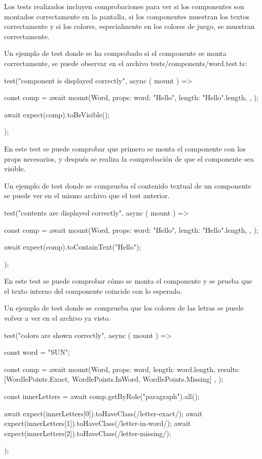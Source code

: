 Los tests realizados incluyen comprobaciones para ver si los componentes son montados correctamente en la pantalla, si los componentes muestran los textos correctamente y si los colores, especialmente en los colores de juego, se muestran correctamente.

Un ejemplo de test donde se ha comprobado si el componente se monta correctamente, se puede observar en el archivo tests/components/word.test.ts:

\begin{mytypescript}[float={!h},caption={Ejemplo test visibilidad componente.},label={alg:test_visibility}]
	test("component is displayed correctly", async ({ mount }) => {
		const comp = await mount(Word, {
			props: {
				word: "Hello",
				length: "Hello".length,
			},
		});

		await expect(comp).toBeVisible();
	});
\end{mytypescript}

En este test se puede comprobar que primero se monta el componente con los props necesarios, y después se realiza la comprobación de que el componente sea visible.

Un ejemplo de test donde se comprueba el contenido textual de un componente se puede ver en el mismo archivo que el test anterior.

\begin{mytypescript}[float={!h},caption={Ejemplo test con texto.},label={alg:test_text}]
	test("contents are displayed correctly", async ({ mount }) => {
		const comp = await mount(Word, {
			props: {
				word: "Hello",
				length: "Hello".length,
			},
		});


		await expect(comp).toContainText("Hello");
	});
\end{mytypescript}

En este test se puede comprobar cómo se monta el componente y se prueba que el texto interno del componente coincide con lo esperado.

Un ejemplo de test donde se comprueba que los colores de las letras se puede volver a ver en el archivo ya visto.

\begin{mytypescript}[float={!h},caption={Ejemplo test colores.},label={alg:test_colors}]
	test("colors are shown correctly", async ({ mount }) => {
		const word = "SUN";


		const comp = await mount(Word, {
			props: {
				word,
				length: word.length,
				results: [WordlePoints.Exact, WordlePoints.InWord, WordlePoints.Missing]
			},
		});


		const innerLetters = await comp.getByRole("paragraph").all();


		await expect(innerLetters[0]).toHaveClass(/letter-exact/);
		await expect(innerLetters[1]).toHaveClass(/letter-in-word/);
		await expect(innerLetters[2]).toHaveClass(/letter-missing/);
	});
\end{mytypescript}

